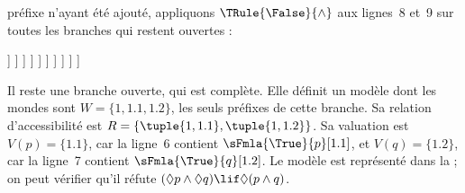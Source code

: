 \documentclass[../../../include/open-logic-section]{subfiles}
\begin{document}
{\begin{ex}
  préfixe n'ayant été ajouté, appliquons $\TRule{\False}{\land}$ aux
  lignes~8 et~9 sur toutes les branches qui restent ouvertes :
  \begin{oltableau}
    [\pFmla{\False}{(\Diamond p \land \Diamond q) \lif \Diamond(p \land q)}{1},
      just = \TAss, checked
      [\pFmla{\True}{\Diamond p \land \Diamond q}{1},
        just = {\TRule{\False}{\lif}[1]}, checked
        [\pFmla{\False}{\Diamond(p \land q)}{1},
          just = {\TRule{\False}{\lif}[1]}, checked
          [\pFmla{\True}{\Diamond p}{1},
            just = {\TRule{\True}{\land}[2]}, checked
            [\pFmla{\True}{\Diamond q}{1},
              just = {\TRule{\True}{\land}[2]}, checked
              [\pFmla{\True}{p}{1.1}, 
                just = {\TRule{\True}{\Diamond}[4]}, checked
                [\pFmla{\True}{q}{1.2}, 
                  just = {\TRule{\True}{\Diamond}[5]}, checked
                  [\pFmla{\False}{p \land q}{1.1}, 
                    just = {\TRule{\False}{\Diamond}[3]}, checked
                    [\pFmla{\False}{p \land q}{1.2}, 
                      just = {\TRule{\False}{\Diamond}[3]}, checked
                      [\pFmla{\False}{p}{1.1},
                        just = {\TRule{\False}{\land}[8]}, checked, close
                      ]
                      [\pFmla{\False}{q}{1.1},
                        just = {\TRule{\False}{\land}[8]}, checked
                        [\pFmla{\False}{p}{1.2},
                          just = {\TRule{\False}{\land}[9]}, checked]
                        [\pFmla{\False}{q}{1.2},
                          just = {\TRule{\False}{\land}[9]}, checked, close]
                      ]
                    ]
                  ]
                ]
              ]
            ]
          ]
        ]
      ]
    ]
  \end{oltableau}
  Il reste une branche ouverte, qui est complète. Elle définit un
  modèle dont les mondes sont $W = \{1, 1.1, 1.2\}$, les seuls
  préfixes de cette branche. Sa relation d'accessibilité est
  $R = \{\tuple{1, 1.1}, \tuple{1, 1.2}\}$. Sa valuation est $V(p) =
  \{1.1\}$, car la ligne~6 contient $\sFmla{\True}{p}[1.1]$, et
  $V(q) = \{1.2\}$, car la ligne~7 contient
  $\sFmla{\True}{q}[1.2]$. Le modèle est représenté dans la
   ; on peut vérifier qu'il réfute
  $(\Diamond p \land \Diamond q) \lif \Diamond (p \land q)$.
  \begin{figure}
  \begin{center}
\end{center}
\end{figure}
\end{ex}}
\end{document}
